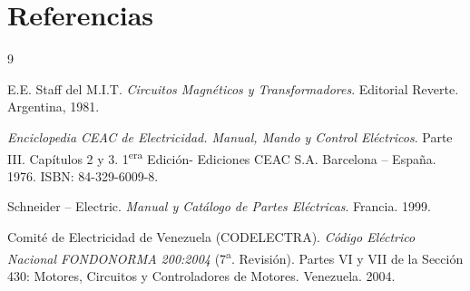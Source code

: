 \section{Referencias}

\begin{thebibliography}{9}

    E.E. Staff del M.I.T. \textit{Circuitos Magnéticos y Transformadores}. Editorial Reverte. Argentina, 1981.
    
    \textit{Enciclopedia CEAC de Electricidad. Manual, Mando y Control Eléctricos}. Parte III. Capítulos 2 y 3. 1\textsuperscript{era} Edición- Ediciones CEAC S.A. Barcelona -- España. 1976. ISBN: 84-329-6009-8.
    
    Schneider -- Electric. \textit{Manual y Catálogo de Partes Eléctricas}. Francia. 1999.
    
    Comité de Electricidad de Venezuela (CODELECTRA). \textit{Código Eléctrico Nacional FONDONORMA 200:2004} (7\textsuperscript{a}. Revisión). Partes VI y VII de la Sección 430: Motores, Circuitos y Controladores de Motores. Venezuela. 2004.

\end{thebibliography}